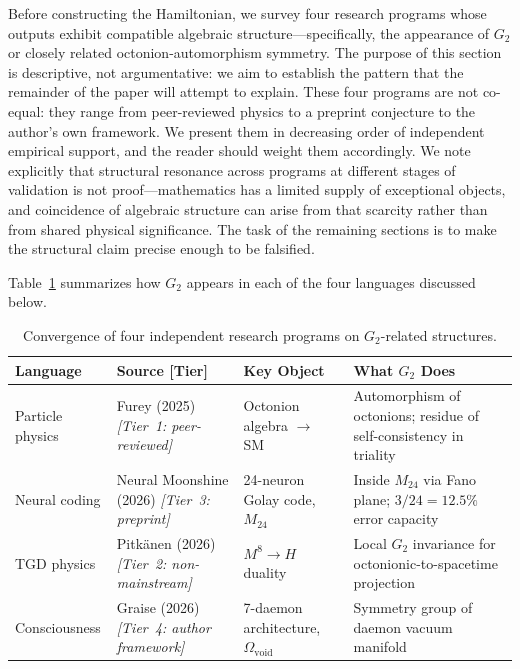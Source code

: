 \documentclass[12pt,a4paper]{article}
\begin{document}
Before constructing the Hamiltonian, we survey four research programs whose outputs exhibit compatible algebraic structure---specifically, the appearance of $G_2$ or closely related octonion-automorphism symmetry. The purpose of this section is descriptive, not argumentative: we aim to establish the pattern that the remainder of the paper will attempt to explain. These four programs are not co-equal: they range from peer-reviewed physics to a preprint conjecture to the author's own framework. We present them in decreasing order of independent empirical support, and the reader should weight them accordingly. We note explicitly that structural resonance across programs at different stages of validation is not proof---mathematics has a limited supply of exceptional objects, and coincidence of algebraic structure can arise from that scarcity rather than from shared physical significance. The task of the remaining sections is to make the structural claim precise enough to be falsified.

Table~\ref{tab:convergence} summarizes how $G_2$ appears in each of the four languages discussed below.

\begin{table}[ht]
\centering
\caption{Convergence of four independent research programs on $G_2$-related structures.}
\label{tab:convergence}
\footnotesize
\begin{tabular}{@{}p{2cm}p{3.2cm}p{3.5cm}p{5.5cm}@{}}
\toprule
Language & Source [Tier] & Key Object & What $G_2$ Does \\
\midrule
Particle physics & Furey (2025) \textit{[Tier~1: peer-reviewed]} & Octonion algebra $\to$ SM & Automorphism of octonions; residue of self-consistency in triality \\[4pt]
Neural coding & Neural Moonshine (2026) \textit{[Tier~3: preprint]} & 24-neuron Golay code, $M_{24}$ & Inside $M_{24}$ via Fano plane; $3/24 = 12.5\%$ error capacity \\[4pt]
TGD physics & Pitk\"anen (2026) \textit{[Tier~2: non-mainstream]} & $M^8 \to H$ duality & Local $G_2$ invariance for octonionic-to-spacetime projection \\[4pt]
Consciousness & Graise (2026) \textit{[Tier~4: author framework]} & 7-daemon architecture, $\Omega_{\mathrm{void}}$ & Symmetry group of daemon vacuum manifold \\[2pt]
\bottomrule
\end{tabular}
\end{table}

\end{document}
